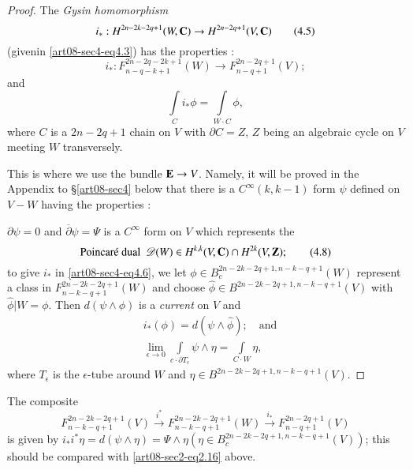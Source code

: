 \begin{proof}
The {\em Gysin homomorphism}
\begin{equation*}
i_{*}:H^{2n-2k-2q+1}(W,\mathbf{C})\to H^{2n-2q+1}(V,\mathbf{C})\tag{4.5}\label{art08-sec4-eq4.5}
\end{equation*}
(given\pageoriginale in \eqref{art08-sec4-eq4.3}) has the properties :
\begin{equation*}
i_{*}:F^{2n-2q-2k+1}_{n-q-k+1}(W)\to F^{2n-2q+1}_{n-q+1}(V);\tag{4.6}\label{art08-sec4-eq4.6}
\end{equation*}
and
\begin{equation*}
\int\limits_{C}i_{*}\phi=\int\limits_{W\cdot C}\phi,\tag{4.7}\label{art08-sec4-eq4.7}
\end{equation*}
where $C$ is a $2n-2q+1$ chain on $V$ with $\partial C=Z$, $Z$ being an algebraic cycle on $V$ meeting $W$ transversely.

This is where we use the bundle $\mathbf{E}\to V$. Namely, it will be proved in the Appendix to \S\ref{art08-sec4} below that there is a $C^{\infty}(k,k-1)$ form $\psi$ defined on $V-W$ having the properties :

$\partial \psi=0$ and $\overline{\partial}\psi=\Psi$ is a $C^{\infty}$ form on $V$ which represents the
\begin{equation*}
\text{Poincar\'e dual~ } \mathscr{D}(W)\in H^{k,k}(V,\mathbf{C})\cap H^{2k}(V,\mathbf{Z});\tag{4.8}\label{art08-sec4-eq4.8}
\end{equation*}
to give $i_{*}$ in \eqref{art08-sec4-eq4.6}, we let $\phi\in B^{2n-2k-2q+1,n-k-q+1}_{c}(W)$ represent a class in $F^{2n-2k-2q+1}_{n-k-q+1}(W)$ and choose $\widehat{\phi}\in B^{2n-2k-2q+1,n-k-q+1}(V)$ with $\widehat{\phi}|W=\phi$. Then $d(\psi\wedge \phi)$ is a {\em current} on $V$ and
\begin{align*}
& i_{*}(\phi)=d(\psi\wedge\widehat{\phi});\quad\text{and}\tag{4.9}\label{art08-sec4-eq4.9}\\
& \lim\limits_{\epsilon \to 0}\int\limits_{c\cdot \partial T_{\epsilon}}\psi\wedge\eta =\int\limits_{C\cdot W}\eta,\tag{4.10}\label{art08-sec4-eq4.10}
\end{align*}
where $T_{\epsilon}$ is the $\epsilon$-tube around $W$ and $\eta\in B^{2n-2k-2q+1,n-k-q+1}(V)$.
\end{proof}

\begin{remark*}
The composite
\begin{equation*}
F^{2n-2k-2q+1}_{n-k-q+1}(V)\xrightarrow{i^{*}}F^{2n-2k-2q+1}_{n-k-q+1}(W)\xrightarrow{i_{*}}F^{2n-2q+1}_{n-q+1}(V)\tag{4.11}\label{art08-sec4-eq4.11}
\end{equation*}
is given by $i_{*}i^{*}\eta=d(\psi\wedge \eta)=\Psi\wedge \eta(\eta\in B^{2n-2k-2q+1,n-k-q+1}_{c}(V))$; this should be compared with \eqref{art08-sec2-eq2.16} above.
\end{remark*}

